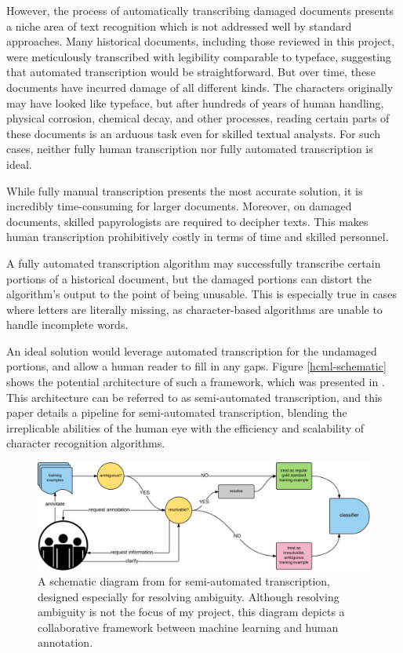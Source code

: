 \documentclass[final]{ukthesis}
\begin{document}
However, the process of automatically transcribing damaged documents presents a niche area of text recognition which is not addressed well by standard approaches. Many historical documents, including those reviewed in this project, were meticulously transcribed with legibility comparable to typeface, suggesting that automated transcription would be straightforward. But over time, these documents have incurred damage of all different kinds. The characters originally may have looked like typeface, but after hundreds of years of human handling, physical corrosion, chemical decay, and other processes, reading certain parts of these documents is an arduous task even for skilled textual analysts. For such cases, neither fully human transcription nor fully automated transcription is ideal.

While fully manual transcription presents the most accurate solution, it is incredibly time-consuming for larger documents. Moreover, on damaged documents, skilled papyrologists are required to decipher texts. This makes human transcription prohibitively costly in terms of time and skilled personnel.

A fully automated transcription algorithm may successfully transcribe certain portions of a historical document, but the damaged portions can distort the algorithm's output to the point of being unusable. This is especially true in cases where letters are literally missing, as character-based algorithms are unable to handle incomplete words.

An ideal solution would leverage automated transcription for the undamaged portions, and allow a human reader to fill in any gaps. Figure \ref{hcml-schematic} shows the potential architecture of such a framework, which was presented in \cite{schaekermann2016resolvable}. This architecture can be referred to as semi-automated transcription, and this paper details a pipeline for semi-automated transcription, blending the irreplicable abilities of the human eye with the efficiency and scalability of character recognition algorithms.


\begin{figure}[t]
\begin{center}
\includegraphics[width=14cm]{hcml-schematic}
\end{center}
\caption{A schematic diagram from \cite{schaekermann2016resolvable} for semi-automated transcription, designed especially for resolving ambiguity. Although resolving ambiguity is not the focus of my project, this diagram depicts a collaborative framework between machine learning and human annotation.}
\label{fig:hcml-schematic}
\end{figure}
\end{document}
